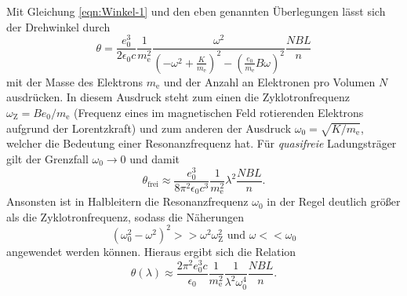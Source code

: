Mit Gleichung \eqref{eqn:Winkel-1} und den eben genannten Überlegungen lässt
sich der Drehwinkel durch
\begin{equation*}
  \theta = \frac{e_0^3}{2 \epsilon_0 c}\frac{1}{m_\text{e}^2}
  \frac{\omega^2}{\left(-\omega^2 + \frac{K}{m_\text{e}}\right)^2 -
  \left(\frac{e_0}{m_\text{e}} B \omega\right)^2}
  \frac{N B L}{n}
\end{equation*}
mit der Masse des Elektrons $m_\text{e}$ und der Anzahl an Elektronen pro
Volumen $N$ ausdrücken.
In diesem Ausdruck steht zum einen die
Zyklotronfrequenz $\omega_\text{Z} = B e_0 / m_\text{e}$ (Frequenz eines im magnetischen
Feld rotierenden Elektrons aufgrund der Lorentzkraft) und zum anderen
der Ausdruck $\omega_0 = \sqrt{K / m_\text{e}}$,
welcher die Bedeutung einer Resonanzfrequenz hat.
Für \emph{quasifreie} Ladungsträger gilt der Grenzfall $\omega_0 \rightarrow 0$
und damit
\begin{equation}
  \theta_\text{frei} \approx \frac{e_0^3}{8 \pi^2 \epsilon_0 c^3}
  \frac{1}{m_\text{e}^2} \lambda^2 \frac{N B L}{n}.
  \label{eqn:theta-frei}
\end{equation}
Ansonsten ist in Halbleitern die Resonanzfrequenz $\omega_0$ in der Regel
deutlich größer als die Zyklotronfrequenz, sodass die Näherungen
\begin{equation*}
  \left(\omega_0^2 - \omega^2\right)^2 >> \omega^2 \omega_\text{Z}^2
  \text{    und    }
  \omega << \omega_0
\end{equation*}
angewendet werden können.
Hieraus ergibt sich die Relation
\begin{equation}
  \theta\left(\lambda\right) \approx \frac{2 \pi^2 e_0^3 c}{\epsilon_0}
  \frac{1}{m_\text{e}^2}\frac{1}{\lambda^2 \omega_0^4}
  \frac{N B L}{n}.
  \label{eqn:theta-gebunden}
\end{equation}
